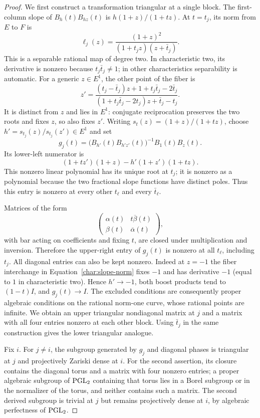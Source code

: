 \begin{proof}
We first construct a transformation triangular at a single block.
The first-column slope of $B_h(t)B_{hz}(t)$ is
$h(1+z)/(1+tz)$. At $t=t_j$, its norm from $E$ to $F$ is
\begin{equation}\label{char:slope-norm}
 \ell_j(z)=\frac{(1+z)^2}{(1+t_jz)(z+\bar t_j)}.
\end{equation}
This is a separable rational map of degree two. In characteristic two,
its derivative is nonzero because $t_j\bar t_j\ne1$; in other
characteristics separability is automatic. For a generic $z\in E^1$,
the other point of the fiber is
\[
 z'=\frac{(t_j-\bar t_j)z+1+t_j\bar t_j-2\bar t_j}
 {(1+t_j\bar t_j-2t_j)z+\bar t_j-t_j}.
\]
It is distinct from $z$ and lies in $E^1$: conjugate reciprocation
preserves the two roots and fixes $z$, so also fixes $z'$.
Writing $s_t(z)=(1+z)/(1+tz)$, choose
$h'=s_{t_j}(z)/s_{t_j}(z')\in E^1$ and set
\[
 g_j(t)=\bigl(B_{h'}(t)B_{h'z'}(t)\bigr)^{-1}B_1(t)B_z(t).
\]
Its lower-left numerator is
\[
 (1+tz')(1+z)-h'(1+z')(1+tz).
\]
This nonzero linear polynomial has its unique root at $t_j$; it is
nonzero as a polynomial because the two fractional slope functions
have distinct poles. Thus this entry is nonzero at every other
$t_\ell$ and every $\bar t_\ell$.

Matrices of the form
\[
 \begin{pmatrix}\alpha(t)&t\overline{\beta}(t)\\
 \beta(t)&\overline{\alpha}(t)\end{pmatrix},
\]
with bar acting on coefficients and fixing $t$, are closed under
multiplication and inversion. Therefore the upper-right entry of
$g_j(t)$ is nonzero at all $t_\ell$, including $t_j$.
All diagonal entries can also be kept nonzero. Indeed at $z=-1$ the
fiber interchange in Equation~\ref{char:slope-norm} fixes $-1$ and
has derivative $-1$ (equal to $1$ in characteristic two). Hence
$h'\to-1$, both boost products tend to $(1-t)I$, and $g_j(t)\to I$.
The excluded conditions are consequently proper algebraic conditions
on the rational norm-one curve, whose rational points are infinite.
We obtain an upper triangular nondiagonal matrix at $j$ and a matrix
with all four entries nonzero at each other block. Using $\bar t_j$
in the same construction gives the lower triangular analogue.

Fix $i$. For $j\ne i$, the subgroup generated by $g_j$ and diagonal
phases is triangular at $j$ and projectively Zariski dense at $i$.
For the second assertion, its closure contains the diagonal torus and
a matrix with four nonzero entries; a proper algebraic subgroup of
$\operatorname{PGL}_2$ containing that torus lies in a Borel subgroup or in the
normalizer of the torus, and neither contains such a matrix. The second derived
subgroup is trivial at $j$ but remains projectively dense at $i$,
by algebraic perfectness of $\operatorname{PGL}_2$.


\end{proof}
